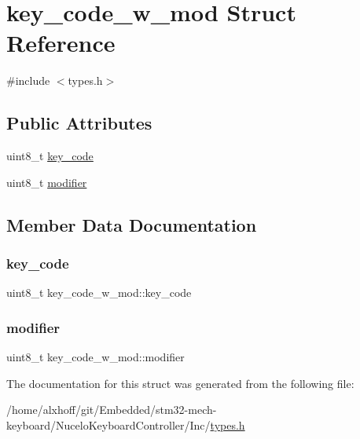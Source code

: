 \hypertarget{structkey__code__w__mod}{}\section{key\+\_\+code\+\_\+w\+\_\+mod Struct Reference}
\label{structkey__code__w__mod}


{\ttfamily \#include $<$types.\+h$>$}

\subsection*{Public Attributes}
\begin{DoxyCompactItemize}
\item 
uint8\+\_\+t \hyperlink{structkey__code__w__mod_a9f45f639e878cc76696b796085b3aa70}{key\+\_\+code}
\item 
uint8\+\_\+t \hyperlink{structkey__code__w__mod_ace05c0395db25f0357ebe432c80334fd}{modifier}
\end{DoxyCompactItemize}


\subsection{Member Data Documentation}
\mbox{\label{structkey__code__w__mod_a9f45f639e878cc76696b796085b3aa70}} 
\subsubsection{\texorpdfstring{key\+\_\+code}{key\_code}}
{\footnotesize\ttfamily uint8\+\_\+t key\+\_\+code\+\_\+w\+\_\+mod\+::key\+\_\+code}

\mbox{\label{structkey__code__w__mod_ace05c0395db25f0357ebe432c80334fd}} 
\subsubsection{\texorpdfstring{modifier}{modifier}}
{\footnotesize\ttfamily uint8\+\_\+t key\+\_\+code\+\_\+w\+\_\+mod\+::modifier}



The documentation for this struct was generated from the following file\+:\begin{DoxyCompactItemize}
\item 
/home/alxhoff/git/\+Embedded/stm32-\/mech-\/keyboard/\+Nucelo\+Keyboard\+Controller/\+Inc/\hyperlink{types_8h}{types.\+h}\end{DoxyCompactItemize}
